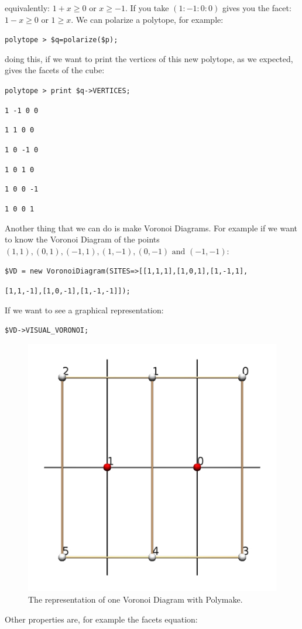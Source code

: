 equivalently: $1+x\geqslant 0$ or $x\geqslant -1$. If you take $(1:-1:0:0)$ gives you the facet: $1-x\geqslant 0$ or $1\geqslant x$.
\newpage
We can polarize a polytope, for example:

\texttt{polytope > \$q=polarize(\$p);}

doing this, if we want to print the vertices of this new polytope, as we expected, gives the facets of the cube:

\texttt{polytope > print \$q->VERTICES;}

\texttt{1 -1 0 0}

\texttt{1 1 0 0}

\texttt{1 0 -1 0}

\texttt{1 0 1 0}

\texttt{1 0 0 -1}

\texttt{1 0 0 1}

Another thing that we can do is make Voronoi Diagrams. For example if we want to know the Voronoi Diagram of the points $(1,1),(0,1),(-1,1),(1,-1),(0,-1)\text{ and }(-1,-1)$:

\texttt{\$VD = new VoronoiDiagram(SITES=>[[1,1,1],[1,0,1],[1,-1,1],}

\texttt{[1,1,-1],[1,0,-1],[1,-1,-1]]);}

If we want to see a graphical representation:

\texttt{\$VD->VISUAL\_VORONOI;}

\begin{figure}[htbp]
  \centering
  \includegraphics[width=0.7\linewidth]{l6_Voronoi.jpg}
  
  \caption{The representation of one Voronoi Diagram with Polymake.}
\label{fig:l6:3}
\end{figure}
\newpage
Other properties are, for example the facets equation:

